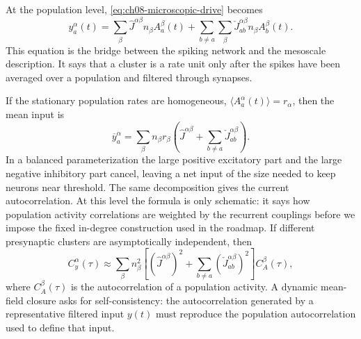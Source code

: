 At the population level, \cref{eq:ch08-microscopic-drive} becomes
\begin{equation}
    y_a^\alpha(t)
    =
    \sum_{\beta}
    \widehat J^{\alpha\beta} n_\beta A_a^\beta(t)
    +
    \sum_{b\ne a}
    \sum_{\beta}
    \check J_{ab}^{\alpha\beta} n_\beta A_b^\beta(t).
    \label{eq:ch08-population-drive}
\end{equation}
This equation is the bridge between the spiking network and the mesoscale
description. It says that a cluster is a rate unit only after the spikes have
been averaged over a population and filtered through synapses.

If the stationary population rates are homogeneous,
\(\langle A_a^\alpha(t)\rangle=r_\alpha\), then the mean input is
\begin{equation}
    \overline y_a^\alpha
    =
    \sum_{\beta}
    n_\beta r_\beta
    \left(
        \widehat J^{\alpha\beta}
        +
        \sum_{b\ne a}\check J_{ab}^{\alpha\beta}
    \right).
    \label{eq:ch08-stationary-mean-input}
\end{equation}
In a balanced parameterization the large positive excitatory part and the large
negative inhibitory part cancel, leaving a net input of the size needed to keep
neurons near threshold. The same decomposition gives the current
autocorrelation. At this level the formula is only schematic: it says how
population activity correlations are weighted by the recurrent couplings before
we impose the fixed in-degree construction used in the roadmap. If different
presynaptic clusters are asymptotically independent, then
\begin{equation}
    C_y^\alpha(\tau)
    \approx
    \sum_{\beta}
    n_\beta^2
    \left[
        \left(\widehat J^{\alpha\beta}\right)^2
        +
        \sum_{b\ne a}
        \left(\check J_{ab}^{\alpha\beta}\right)^2
    \right]
    C_A^\beta(\tau),
    \label{eq:ch08-current-autocorrelation}
\end{equation}
where \(C_A^\beta(\tau)\) is the autocorrelation of a population activity. A
dynamic mean-field closure asks for self-consistency: the autocorrelation
generated by a representative filtered input \(y(t)\) must reproduce the
population autocorrelation used to define that input.

